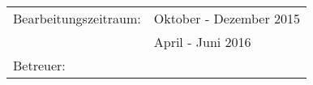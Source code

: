 \begin{titlepage}
\begin{center}
	\setlength{\tabcolsep}{24pt}	%
	\begin{tabular}{ll}
		Bearbeitungszeitraum:&Oktober - Dezember 2015\\
		&April - Juni 2016\\
		Betreuer:&\mytutor\\
	\end{tabular}
	\setlength{\tabcolsep}{6pt}		%
	\restoregeometry
\end{center}
\end{titlepage}
\clearpage
